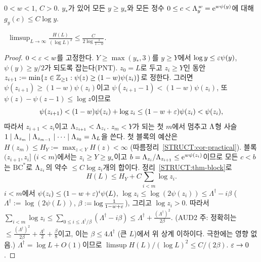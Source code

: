 \begin{hypothesis}[$\mathrm{BC}^*(w,C)$]\label{STRUCT:hyp-BC}
$0<w<1$, $C>0$. $y_*$가 있어 모든 $y\ge y_*$와 모든 정수 $0\le c<\Lambda_y^{\,w}=\mathrm{e}^{w\psi(y)}$에 대해 $g_y(c)\le C\log y$. \OPEN
\end{hypothesis}

\begin{theorem}\label{STRUCT:thm-BC}
\ $\displaystyle\limsup_{L\to\infty}\frac{H(L)}{(\log L)^2}\le\frac{C}{2\log\frac1{1-w}}$.
\end{theorem}
\begin{proof}
$0<\varepsilon<w$를 고정한다. $Y\ge\max(y_*,3)$를 $y\ge Y$에서 $\log y\le\varepsilon\psi(y)$, $\psi(y)\ge y/2$가 되도록 잡는다(PNT).
$z_0=L$로 두고 $z_i\ge Y$인 동안 $z_{i+1}:=\min\{z\in\mathbb{Z}_{\ge1}:\psi(z)\ge(1-w)\psi(z_i)\}$로 정한다. 그러면 $\psi(z_{i+1})\ge(1-w)\psi(z_i)$이고 $\psi(z_{i+1}-1)<(1-w)\psi(z_i)$, 또 $\psi(z)-\psi(z-1)\le\log z$이므로
\[
\psi(z_{i+1})<(1-w)\psi(z_i)+\log z_i\le(1-w+\varepsilon)\psi(z_i)<\psi(z_i),
\]
따라서 $z_{i+1}<z_i$이고 $\Lambda_{z_{i+1}}<\Lambda_{z_i}$. $z_m<Y$가 되는 첫 $m$에서 멈추고 $\Lambda$형 사슬 $1\mid\Lambda_{z_m}\mid\Lambda_{z_{m-1}}\mid\dots\mid\Lambda_{z_0}=\Lambda_L$을 쓴다.
첫 블록의 예산은 $H(z_m)\le H_Y:=\max_{z<Y}H(z)<\infty$ (따름정리~\ref{STRUCT:cor-practical}). 블록 $(z_{i+1},z_i]$ ($i<m$)에서는 $z_i\ge Y\ge y_*$이고 $b=\Lambda_{z_i}/\Lambda_{z_{i+1}}\le\mathrm{e}^{w\psi(z_i)}$이므로 모든 $c<b$는 $\mathrm{BC}^*$로 $\Lambda_{z_i}$의 약수 $\le C\log z_i$개의 합이다. 정리~\ref{STRUCT:thm-block}로
\[
H(L)\le H_Y+C\sum_{i<m}\log z_i .
\]
$i<m$에서 $\psi(z_i)\le(1-w+\varepsilon)^i\psi(L)$, $\log z_i\le\log(2\psi(z_i))\le\Lambda^\dagger-i\beta$ ($\Lambda^\dagger:=\log(2\psi(L))$, $\beta:=\log\frac1{1-w+\varepsilon}$), 그리고 $\log z_i>0$. 따라서 $\sum_{i<m}\log z_i\le\sum_{0\le i\le\Lambda^\dagger/\beta}(\Lambda^\dagger-i\beta)\le\Lambda^\dagger+\frac{(\Lambda^\dagger)^2}{2\beta}$.
(AUD2 주: 정확히는 $\le\frac{(\Lambda^\dagger)^2}{2\beta}+\frac{\Lambda^\dagger}2+\frac\beta8$이고, 이는 $\beta\le4\Lambda^\dagger$ (큰 $L$)에서 위 상계 이하이다. 극한에는 영향 없음.) $\Lambda^\dagger=\log L+O(1)$이므로 $\limsup H(L)/(\log L)^2\le C/(2\beta)$. $\varepsilon\to0$.
\end{proof}

